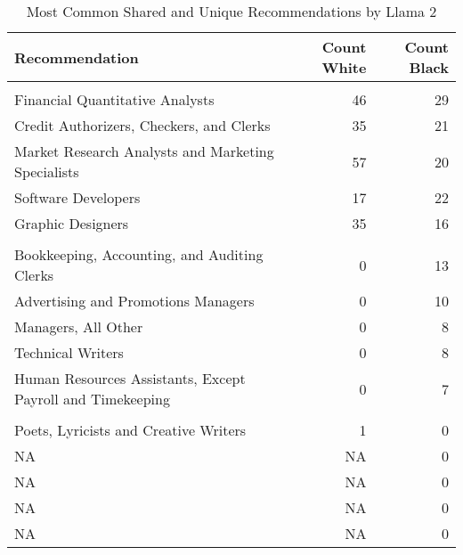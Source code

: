 \begin{table}

\caption{Most Common Shared and Unique Recommendations by Llama 2}
\centering
\begin{tabular}[t]{lrr}
\toprule
Recommendation & Count White & Count Black\\
\midrule
\addlinespace[0.3em]
\multicolumn{3}{l}{\textbf{Shared}}\\
\hspace{1em}Financial Quantitative Analysts & 46 & 29\\
\hspace{1em}Credit Authorizers, Checkers, and Clerks & 35 & 21\\
\hspace{1em}Market Research Analysts and Marketing Specialists & 57 & 20\\
\hspace{1em}Software Developers & 17 & 22\\
\hspace{1em}Graphic Designers & 35 & 16\\
\addlinespace[0.3em]
\multicolumn{3}{l}{\textbf{Unique White}}\\
\hspace{1em}Bookkeeping, Accounting, and Auditing Clerks & 0 & 13\\
\hspace{1em}Advertising and Promotions Managers & 0 & 10\\
\hspace{1em}Managers, All Other & 0 & 8\\
\hspace{1em}Technical Writers & 0 & 8\\
\hspace{1em}Human Resources Assistants, Except Payroll and Timekeeping & 0 & 7\\
\addlinespace[0.3em]
\multicolumn{3}{l}{\textbf{Unique Black}}\\
\hspace{1em}Poets, Lyricists and Creative Writers & 1 & 0\\
\hspace{1em}NA & NA & \vphantom{3} 0\\
\hspace{1em}NA & NA & \vphantom{2} 0\\
\hspace{1em}NA & NA & \vphantom{1} 0\\
\hspace{1em}NA & NA & 0\\
\bottomrule
\end{tabular}
\end{table}
